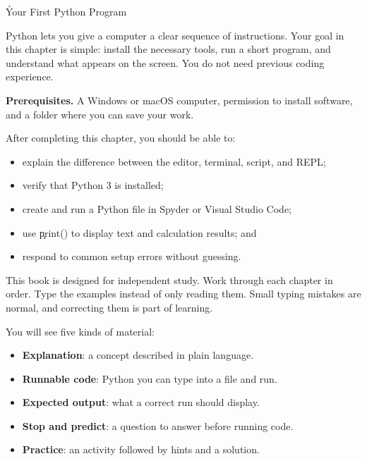 
\h{Your First Python Program}
\label{ch:01}

Python lets you give a computer a clear sequence of instructions. Your goal in
this chapter is simple: install the necessary tools, run a short program, and
understand what appears on the screen. You do not need previous coding
experience.

\begin{NoteBox}
\textbf{Prerequisites.} A Windows or macOS computer, permission to install
software, and a folder where you can save your work.
\end{NoteBox}

\begin{tcolorbox}[title=Learning outcomes,colframe=orange,colback=white,arc=2mm]
After completing this chapter, you should be able to:
\begin{itemize}
    \item explain the difference between the editor, terminal, script, and REPL;
    \item verify that Python 3 is installed;
    \item create and run a Python file in Spyder or Visual Studio Code;
    \item use \c{print()} to display text and calculation results; and
    \item respond to common setup errors without guessing.
\end{itemize}
\end{tcolorbox}


This book is designed for independent study. Work through each chapter in
order. Type the examples instead of only reading them. Small typing mistakes
are normal, and correcting them is part of learning.

You will see five kinds of material:
\begin{itemize}
    \item \textbf{Explanation}: a concept described in plain language.
    \item \textbf{Runnable code}: Python you can type into a file and run.
    \item \textbf{Expected output}: what a correct run should display.
    \item \textbf{Stop and predict}: a question to answer before running code.
    \item \textbf{Practice}: an activity followed by hints and a solution.
\end{itemize}

